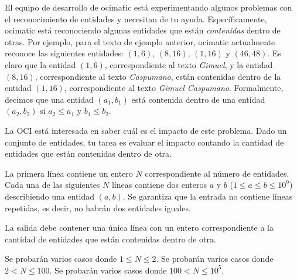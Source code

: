 \documentclass{oci}
\begin{document}
\begin{problemDescription}
El equipo de desarrollo de ocimatic está experimentando algunos problemas con
el reconocimiento de entidades y necesitan de tu ayuda.
Específicamente, ocimatic está reconociendo algunas entidades que están
\emph{contenidas} dentro de otras.
Por ejemplo, para el texto de ejemplo anterior, ocimatic actualmente reconoce las
siguientes entidades: $(1, 6)$, $(8, 16)$, $(1, 16)$ y $(46, 48)$.
Es claro que la entidad $(1, 6)$, correspondiente al texto \emph{Gimuel}, y la
entidad $(8, 16)$, correspondiente al texto \emph{Caspumano}, están
contenidas dentro de la entidad $(1, 16)$, correspondiente al texto \emph{Gimuel
  Caspumano}.
Formalmente, decimos que una entidad $(a_1,b_1)$ está contenida dentro de una
entidad $(a_2,b_2)$ si $a_2\leq a_1$ y $b_1\leq b_2$.

La OCI está interesada en saber cuál es el impacto de este problema.
Dado un conjunto de entidades, tu tarea es evaluar el impacto contando la
cantidad de entidades que están contenidas dentro de otra.
\end{problemDescription}

\begin{inputDescription}
  La primera línea contiene un entero $N$ correspondiente al número de entidades.
  Cada una de las siguientes $N$ líneas contiene dos enteros $a$ y $b$ ($1\leq
  a\leq b \leq 10^9$) describiendo una entidad $(a,b)$.
  Se garantiza que la entrada no contiene líneas repetidas, es decir, no habrán
  dos entidades iguales.
\end{inputDescription}

\begin{outputDescription}
  La salida debe contener una única línea con un entero correspondiente a la cantidad de
  entidades que están contenidas dentro de otra.
\end{outputDescription}

\begin{scoreDescription}
   Se probarán varios casos donde $1\leq N\leq 2$.
   Se probarán varios casos donde $2< N \leq 100$.
   Se probarán varios casos donde $100< N \leq 10^5$.
\end{scoreDescription}

\begin{sampleDescription}
\end{sampleDescription}
\end{document}
